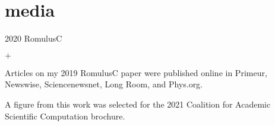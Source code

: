 \documentclass[]{luger-cv} %
\begin{document}
\ifdefined \onepage \else
{}
\fi



\vspace*{-2mm}
\section{media}
\begin{entrylist}

\entry
{2020}
{RomulusC}
{}
{%
    \vspace{-1em}
    \begin{list}{$+$}{\cvlist}
    \item Articles on my 2019 RomulusC paper were published online in Primeur, Newswise,
         Sciencenewsnet, Long Room, and Phys.org.
    \item A figure from this work was selected for the 2021 Coalition for
        Academic Scientific Computation brochure.
    \end{list}
}
\end{entrylist}
\end{document}
